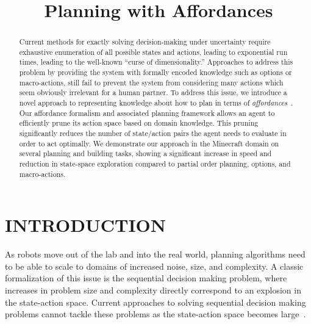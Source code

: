 \documentclass[]{article}
\title{Planning with Affordances}
\begin{document}
\author{}
\maketitle

\begin{abstract}
Current methods for exactly solving decision-making under uncertainty
require exhaustive enumeration of all possible states and actions,
leading to exponential run times, leading to the well-known ``curse of
dimensionality.''  Approaches to address this problem by providing the
system with formally encoded knowledge such as options or
macro-actions, still fail to prevent the system from considering many
actions which seem obviously irrelevant for a human partner.  To
address this issue, we introduce a novel approach to representing
knowledge about how to plan in terms of {\em
  affordances}~\citep{gibson77}.  Our affordance formalism and
associated planning framework allows an agent to efficiently prune its
action space based on domain knowledge.  This pruning significantly
reduces the number of state/action pairs the agent needs to evaluate
in order to act optimally.  We demonstrate our approach in the
Minecraft domain on several planning and building tasks, showing a
significant increase in speed and reduction in state-space exploration
compared to partial order planning, options, and macro-actions.
\end{abstract}

\section{INTRODUCTION}

As robots move out of the lab and into the real world, planning
algorithms need to be able to scale to domains of increased noise,
size, and complexity.  A classic formalization of this issue is the
sequential decision making problem, where increases in problem size
and complexity directly correspond to an explosion in the state-action
space. Current approaches to solving sequential decision making
problems cannot tackle these problems as the state-action space
becomes large~\citep{Grounds2005}.
\end{document}
